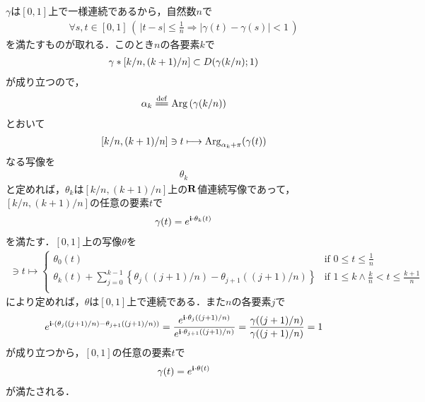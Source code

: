 	\begin{sketch}
		$\gamma$は$[0,1]$上で一様連続であるから，自然数$n$で
		\begin{align}
			\forall s,t \in [0,1]\, \left(\, |t-s| \leq \frac{1}{n} \Longrightarrow |\gamma(t) - \gamma(s)| < 1\, \right)
		\end{align}
		を満たすものが取れる．このとき$n$の各要素$k$で
		\begin{align}
			\gamma \ast \left[k/n,(k+1)/n\right] \subset D(\gamma(k/n);1)
		\end{align}
		が成り立つので，
		\begin{align}
			\alpha_{k} \defeq \pvarg{(\gamma(k/n))}
		\end{align}
		とおいて
		\begin{align}
			\left[k/n,(k+1)/n\right] \ni t \longmapsto \operatorname{Arg}_{\alpha_{k} + \pi}(\gamma(t))
		\end{align}
		なる写像を
		\begin{align}
			\theta_{k}
		\end{align}
		と定めれば，$\theta_{k}$は$\left[k/n,(k+1)/n\right]$上の$\mathbf{R}$値連続写像であって，
		$\left[k/n,(k+1)/n\right]$の任意の要素$t$で
		\begin{align}
			\gamma(t) = e^{\mathbf{i} \cdot \theta_{k}(t)}
		\end{align}
		を満たす．$[0,1]$上の写像$\theta$を
		\begin{align}
			[0,1] \ni t \longmapsto
			\begin{cases}
				\theta_{0}(t) & \mbox{if } {\displaystyle 0 \leq t \leq \frac{1}{n}} \\
				{\displaystyle \theta_{k}(t) + \sum_{j=0}^{k-1} \left\{\theta_{j}((j+1)/n) - \theta_{j+1}((j+1)/n)\right\}}
				& \mbox{if } 1 \leq k \wedge {\displaystyle \frac{k}{n} < t \leq \frac{k+1}{n}} \\
			\end{cases}
		\end{align}
		により定めれば，$\theta$は$[0,1]$上で連続である．また$n$の各要素$j$で
		\begin{align}
			e^{\mathbf{i} \cdot \left(\theta_{j}((j+1)/n) - \theta_{j+1}((j+1)/n)\right)}
			= \frac{e^{\mathbf{i} \cdot \theta_{j}((j+1)/n)}}{e^{\mathbf{i} \cdot \theta_{j+1}((j+1)/n)}}
			= \frac{\gamma((j+1)/n)}{\gamma((j+1)/n)}
			= 1
		\end{align}
		が成り立つから，$[0,1]$の任意の要素$t$で
		\begin{align}
			\gamma(t) = e^{\mathbf{i} \cdot \theta(t)}
		\end{align}
		が満たされる．
		\QED
	\end{sketch}
	
